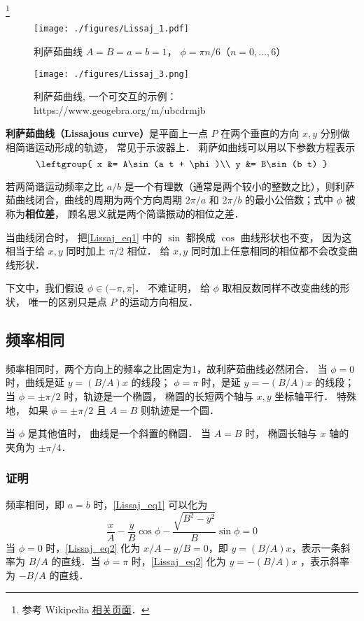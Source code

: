 

\footnote{参考 Wikipedia \href{https://en.wikipedia.org/wiki/Lissajous_curve}{相关页面}．}

\begin{figure}[ht]
\centering
\texttt{[image: ./figures/Lissaj\_1.pdf]}
\caption{利萨茹曲线 $A = B = a = b = 1$， $\phi = \pi n/6$（$n = 0,\dots,6$）}
\end{figure}

\begin{figure}[ht]
\centering
\texttt{[image: ./figures/Lissaj\_3.png]}
\caption{利萨茹曲线, 一个可交互的示例：https://www.geogebra.org/m/ubcdrmjb} \label{Lissaj_fig3}
\end{figure}

\textbf{利萨茹曲线（Lissajous curve）}是平面上一点 $P$ 在两个垂直的方向 $x, y$ 分别做相简谐运动形成的轨迹， 常见于示波器上． 莉萨如曲线可以用以下参数方程表示
\begin{equation}\label{Lissaj_eq1}
\leftgroup{
x &= A\sin(a t + \phi)\\
y &= B\sin(b t)
}\end{equation}

若两简谐运动频率之比 $a/b$ 是一个有理数（通常是两个较小的整数之比），则利萨茹曲线闭合，曲线的周期为两个方向周期 $2\pi/a$ 和 $2\pi/b$ 的最小公倍数；式中 $\phi$ 被称为\textbf{相位差}， 顾名思义就是两个简谐振动的相位之差．

当曲线闭合时， 把\autoref{Lissaj_eq1} 中的 $\sin$ 都换成 $\cos$ 曲线形状也不变， 因为这相当于给 $x, y$ 同时加上 $\pi/2$ 相位． 给 $x, y$ 同时加上任意相同的相位都不会改变曲线形状．

下文中，我们假设 $\phi \in (-\pi, \pi]$． 不难证明， 给 $\phi$ 取相反数同样不改变曲线的形状， 唯一的区别只是点 $P$ 的运动方向相反．

\subsection{频率相同}
频率相同时，两个方向上的频率之比固定为1，故利萨茹曲线必然闭合．
当 $\phi = 0$ 时，曲线是延 $y=(B/A)x$ 的线段； $\phi = \pi$ 时，是延 $y=-(B/A)x$ 的线段； 当 $\phi = \pm\pi/2$ 时，轨迹是一个椭圆， 椭圆的长短两个轴与 $x,y$ 坐标轴平行． 特殊地， 如果 $\phi = \pm\pi/2$ 且 $A = B$ 则轨迹是一个圆．

当 $\phi$ 是其他值时， 曲线是一个斜置的椭圆． 当 $A = B$ 时， 椭圆长轴与 $x$ 轴的夹角为 $\pm\pi/4$．
\subsubsection{证明}
频率相同，即 $a=b$ 时，\autoref{Lissaj_eq1} 可以化为
\begin{equation}\label{Lissaj_eq2}
\frac xA-\frac yB\cos\phi-\frac{\sqrt{B^2-y^2}}{B}\sin\phi=0
\end{equation}
当 $\phi=0$ 时，\autoref{Lissaj_eq2} 化为 $x/A-y/B=0$，即 $y=(B/A)x$，表示一条斜率为 $B/A$ 的直线．当 $\phi=\pi$ 时，\autoref{Lissaj_eq2} 化为 $y=-(B/A)x$ ，表示斜率为 $-B/A$ 的直线．

